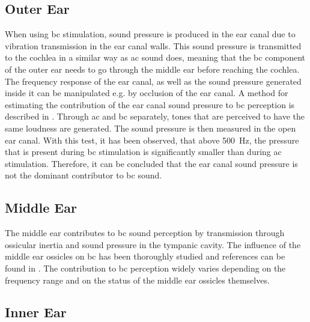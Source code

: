 
\subsection*{Outer Ear}

When using \gls{bc} stimulation, sound pressure is produced in the ear canal due to vibration transmission in the ear canal walls. This sound pressure is transmitted to the cochlea in a similar way as \gls{ac} sound does, meaning that the \gls{bc} component of the outer ear needs to go through the middle ear before reaching the cochlea. The frequency response of the ear canal, as well as the sound pressure generated inside it can be manipulated e.g. by occlusion of the ear canal. A method for estimating the contribution of the ear canal sound pressure to \gls{bc} perception is described in \citep{puria_2013}. Through \gls{ac} and \gls{bc} separately, tones that are perceived to have the same loudness are generated. The sound pressure is then measured in the open ear canal. With this test, it has been observed, that above \SI{500}{\hertz}, the pressure that is present during \gls{bc} stimulation is significantly smaller than during \gls{ac} stimulation. Therefore, it can be concluded that the ear canal sound pressure is not the dominant contributor to \gls{bc} sound.

\subsection*{Middle Ear}

The middle ear contributes to \gls{bc} sound perception by transmission through ossicular inertia and sound pressure in the tympanic cavity. The influence of the middle ear ossicles on \gls{bc} has been thoroughly studied and references can be found in \citep[Sec. 6.5]{puria_2013}. The contribution to \gls{bc} perception widely varies depending on the frequency range and on the status of the middle ear ossicles themselves.

\subsection*{Inner Ear}

